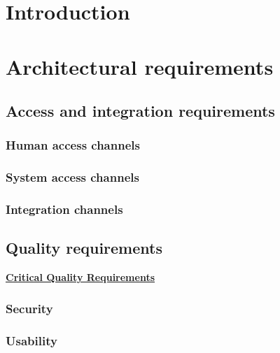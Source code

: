 \documentclass[a4paper,12pt,titlepage]{article}
\begin{document}


\tableofcontents
\newpage

\section{Introduction}

\section{Architectural requirements}
	
	\subsection{Access and integration requirements}
			\subsubsection{Human access channels}	
				
			\subsubsection{System access channels}
					
			\subsubsection{Integration channels}
				
 	\subsection{Quality requirements}
 	
		\underline{\textbf{Critical Quality Requirements}}
		\subsubsection{Security} \label{sec:security}
			
			
		\subsubsection{Usability} \label{sec:usability}
			
			
\end{document}
